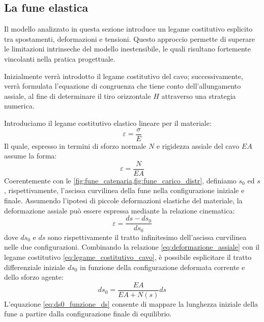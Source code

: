 \subsection{La fune elastica}
Il modello analizzato in questa sezione introduce un legame costitutivo esplicito tra spostamenti, deformazioni e tensioni. Questo approccio permette di superare le limitazioni intrinseche del modello inestensibile, le quali risultano fortemente vincolanti nella pratica progettuale.

Inizialmente verrà introdotto il legame costitutivo del cavo; successivamente, verrà formulata l'equazione di congruenza che tiene conto dell'allungamento assiale, al fine di determinare il tiro orizzontale $H$ attraverso una strategia numerica.

Introduciamo il legame costitutivo elastico lineare per il materiale: 
\begin{equation}
   \varepsilon = \frac{\sigma}{E}
   \label{eq:legame_costitutivo_materiale}
\end{equation}
Il quale, espresso in termini di sforzo normale $N$  e rigidezza assiale del cavo $EA$ assume la forma: 
\begin{equation}
   \varepsilon = \frac{N}{EA}
   \label{eq:legame_costitutivo_cavo}
\end{equation}
Coerentemente con le \cref{fig:fune_catenaria,fig:fune_carico_distr}, definiamo $s_0$ ed $s$, rispettivamente, l'ascissa curvilinea della fune nella configurazione iniziale e finale. 
Assumendo l'ipotesi di piccole deformazioni elastiche del materiale, la deformazione assiale può essere espressa mediante la relazione cinematica:
\begin{equation}
   \varepsilon = \frac{ds - ds_0}{ds_0}
   \label{eq:deformazione_assiale}
\end{equation}
dove $ds_0$ e $ds$ sono rispettivamente il tratto infinitesimo dell'ascissa curvilinea nelle due configurazioni.
Combinando la relazione \eqref{eq:deformazione_assiale} con il legame costitutivo \eqref{eq:legame_costitutivo_cavo}, è possibile esplicitare il tratto differenziale iniziale $ds_0$ in funzione della configurazione deformata corrente e dello sforzo agente: 
\begin{equation}
   ds_0 = \frac{EA}{EA + N(s)} ds
   \label{eq:ds0_funzione_ds}
\end{equation}
L'equazione \eqref{eq:ds0_funzione_ds} consente di mappare la lunghezza iniziale della fune a partire dalla configurazione finale di equilibrio.

